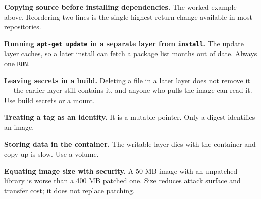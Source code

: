 \begin{pitfall}
\begin{tight}
  \item \textbf{Copying source before installing dependencies.} The worked
        example above. Reordering two lines is the single highest-return
        change available in most repositories.
  \item \textbf{Running \texttt{apt-get update} in a separate layer from
        \texttt{install}.} The update layer caches, so a later install can
        fetch a package list months out of date. Always one \texttt{RUN}.
  \item \textbf{Leaving secrets in a build.} Deleting a file in a later layer
        does not remove it --- the earlier layer still contains it, and anyone
        who pulls the image can read it. Use build secrets or a mount.
  \item \textbf{Treating a tag as an identity.} It is a mutable pointer. Only
        a digest identifies an image.
  \item \textbf{Storing data in the container.} The writable layer dies with
        the container and copy-up is slow. Use a volume.
  \item \textbf{Equating image size with security.} A 50 MB image with an
        unpatched library is worse than a 400 MB patched one. Size reduces
        attack surface and transfer cost; it does not replace patching.
\end{tight}
\end{pitfall}

